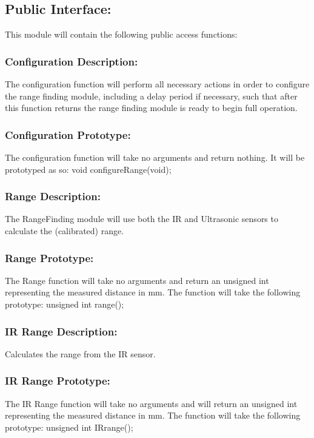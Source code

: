 \documentclass[]{article}
\begin{document}
\subsection{Public Interface:}
This module will contain the following public access functions:

\subsubsection{Configuration Description:}
The configuration function will perform all necessary actions in order to configure the range finding module, including a delay period if necessary, such that after this function returns the range finding module is ready to begin full operation.

\subsubsection{Configuration Prototype:}
The configuration function will take no arguments and return nothing. It will be prototyped as so: \newline \newline
void configureRange(void); 

\subsubsection{Range Description:}
The RangeFinding module will use both the IR and Ultrasonic sensors to calculate the (calibrated) range.

\subsubsection{Range Prototype:}
The Range function will take no arguments and return an unsigned int representing the measured distance in mm. The function will take the following prototype: \newline \newline
unsigned int range();

\subsubsection{IR Range Description:}
Calculates the range from the IR sensor.

\subsubsection{IR Range Prototype:}
The IR Range function will take no arguments and will return an unsigned int representing the measured distance in mm. The function will take the following prototype: \newline \newline 
unsigned int IRrange();
\end{document}
